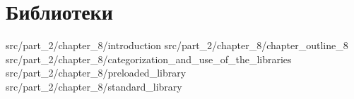 \chapter{Библиотеки}
\label{chpt:libraries}

 {src/part_2/chapter_8/introduction}
 {src/part_2/chapter_8/chapter_outline_8}
 {src/part_2/chapter_8/categorization_and_use_of_the_libraries}
 {src/part_2/chapter_8/preloaded_library}
 {src/part_2/chapter_8/standard_library}
